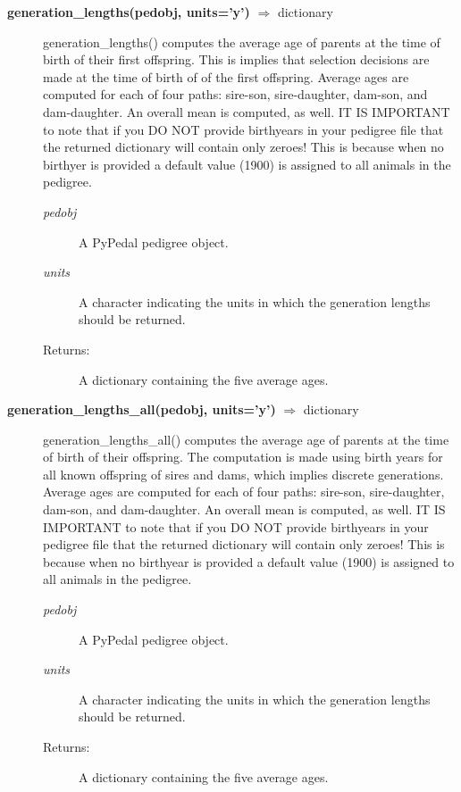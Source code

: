 \begin{description}
\item[\textbf{generation\_lengths(pedobj, units='y')} $\Rightarrow$ dictionary]
generation\_lengths() computes the average age of parents at the time of birth of their first offspring. This is implies that selection decisions are made at the time of birth of of the first offspring. Average ages are computed for each of four paths: sire-son, sire-daughter, dam-son, and dam-daughter. An overall mean is computed, as well. IT IS IMPORTANT to note that if you DO NOT provide birthyears in your pedigree file that the returned dictionary will contain only zeroes! This is because when no birthyer is provided a default value (1900) is assigned to all animals in the pedigree.
\begin{description}
\item[\emph{pedobj}] A PyPedal pedigree object.
\item[\emph{units}] A character indicating the units in which the generation lengths should be returned.
\item[Returns:] A dictionary containing the five average ages.
\end{description}

\item[\textbf{generation\_lengths\_all(pedobj, units='y')} $\Rightarrow$ dictionary]
generation\_lengths\_all() computes the average age of parents at the time of birth of their offspring. The computation is made using birth years for all known offspring of sires and dams, which implies discrete generations. Average ages are computed for each of four paths: sire-son, sire-daughter, dam-son, and dam-daughter. An overall mean is computed, as well. IT IS IMPORTANT to note that if you DO NOT provide birthyears in your pedigree file that the returned dictionary will contain only zeroes! This is because when no birthyear is provided a default value (1900) is assigned to all animals in the pedigree.
\begin{description}
\item[\emph{pedobj}] A PyPedal pedigree object.
\item[\emph{units}] A character indicating the units in which the generation lengths should be returned.
\item[Returns:] A dictionary containing the five average ages.
\end{description}


\end{description}
